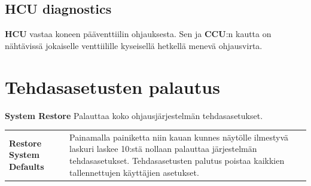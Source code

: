 \documentclass[12pt,a4paper,finnish]{uvmanual}
\begin{document}
\FloatBarrier
\subsection{HCU diagnostics}\label{ch:system_diagnostics_ecu}


\textbf{HCU} vastaa koneen pääventtiilin ohjauksesta. Sen ja \textbf{CCU}:n kautta on nähtävissä jokaiselle venttiilille kyseisellä hetkellä menevä ohjausvirta.



\section{Tehdasasetusten palautus}\label{ch:system_restore}

\textbf{System Restore} Palauttaa koko ohjausjärjestelmän tehdasasetukset.


\begin{tabular}{ L{0.2\textwidth} L{0.66\textwidth} }
\textbf{Restore System Defaults} & Painamalla painiketta niin kauan kunnes näytölle ilmestyvä laskuri laskee 10:stä nollaan palauttaa järjestelmän tehdasasetukset. Tehdasasetusten palutus poistaa kaikkien tallennettujen käyttäjien asetukset. \\
\end{tabular}
\end{document}
